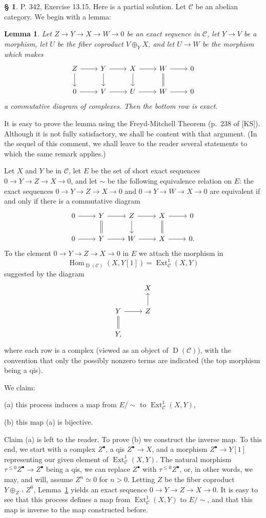 \documentclass[12pt]{article}
\newtheorem{lem}[thm]{Lemma}
\theoremstyle{remark}
\theoremstyle{definition}
\newtheorem{cm}[thm]{\S}
\newcommand{\bc}{\begin{cm}}\newcommand{\ec}{\end{cm}}
\newcommand{\C}{\mathcal C}
\newcommand{\oo}{\operatorname}
\DeclareMathOperator{\h}{Hom}
\begin{document}

\bc P. 342, Exercise 13.15. Here is a partial solution. Let $\C$ be an abelian category. We begin with a lemma:

\begin{lem}\label{738}
Let $Z\to Y\to X\to W\to0$ be an exact sequence in $\C$, let $Y\to V$ be a morphism, let $U$ be the fiber coproduct $V\oplus_YX$, and let $U\to W$ be the morphism which makes 
$$
\begin{tikzcd}
Z\ar{d}\ar{r}&Y\ar{d}\ar{r}&X\ar{d}\ar{r}&W\ar[equal]{d}\ar{r}&0\\ 
0\ar{r}&V\ar{r}&U\ar{r}&W\ar{r}&0
\end{tikzcd}
$$ 
a commutative diagram of complexes. Then the bottom row is exact.
\end{lem}

It is easy to prove the lemma using the Freyd-Mitchell Theorem (p.~238 of [KS]). Although it is not fully satisfactory, we shall be content with that argument. (In the sequel of this comment, we shall leave to the reader several statements to which the same remark applies.)

Let $X$ and $Y$ be in $\C$, let $E$ be the set of short exact sequences $0\to Y\to Z\to X\to0$, and let $\sim$ be the following equivalence relation on $E$: the exact sequences $0\to Y\to Z\to X\to0$ and $0\to Y\to W\to X\to0$ are equivalent if and only if there is a commutative diagram 
$$
\begin{tikzcd}
0\ar{r}&Y\ar[equal]{d}\ar{r}&Z\ar{d}\ar{r}&X\ar[equal]{d}\ar{r}&0\\ 
0\ar{r}&Y\ar{r}&W\ar{r}&X\ar{r}&0.
\end{tikzcd}
$$ 
To the element $0\to Y\to Z\to X\to0$ in $E$ we attach the morphism in 
$$
\h_{\oo D(\C)}(X,Y[1])=\oo{Ext}^1_\C(X,Y)
$$ 
suggested by the diagram 
$$
\begin{tikzcd}
{}&X\\ 
Y\ar[equal]{d}\ar{r}&Z\ar{u}\\ 
Y,
\end{tikzcd}
$$ 
where each row is a complex (viewed as an object of $\oo D(\C)$), with the convention that only the possibly nonzero terms are indicated (the top morphism being a qis). 

We claim: 

(a) this process induces a map from $E/\!\!\sim$ to $\oo{Ext}^1_\C(X,Y)$, 

(b) this map (a) is bijective. 

Claim (a) is left to the reader. To prove (b) we construct the inverse map. To this end, we start with a complex $Z^\bullet$, a qis $Z^\bullet\to X$, and a morphism $Z^\bullet\to Y[1]$ representing our given element of $\oo{Ext}^1_\C(X,Y)$. The natural morphism $\tau^{\le0}Z^\bullet\to Z^\bullet$ being a qis, we can replace $Z^\bullet$ with $\tau^{\le0}Z^\bullet$, or, in other words, we may, and will, assume $Z^n\simeq0$ for $n>0$. Letting $Z$ be the fiber coproduct $Y\oplus_{Z^{-1}}Z^0$, Lemma~\ref{738} yields an exact sequence $0\to Y\to Z\to X\to0$. It is easy to see that this process defines a map from $\oo{Ext}^1_\C(X,Y)$ to $E/\!\!\sim$, and that this map is inverse to the map constructed before.
\ec 
\end{document}
